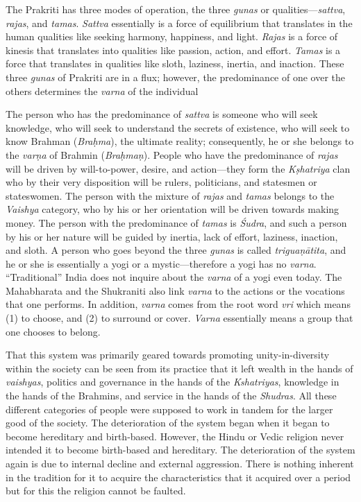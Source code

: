 The Prakriti  has three modes of operation, the three \textit{gunas} or qualities—\textit{sattva},  \textit{rajas},   and \textit{tamas}. \textit{Sattva} essentially is a force of equilibrium that translates in the human qualities like seeking harmony, happiness, and light. \textit{Rajas} is a force of kinesis that translates into qualities like passion, action, and effort. \textit{Tamas} is a force that translates in qualities like sloth, laziness, inertia, and inaction. These three \textit{gunas} of Prakriti  are in a flux; however, the predominance of one over the others determines the \textit{varna} of the individual

The person who has the predominance of \textit{sattva} is someone who will seek knowledge, who will seek to understand the secrets of existence, who will seek to know Brahman (\textit{Braḥma}), the ultimate reality; consequently, he or she belongs to the \textit{varṇa} of Brahmin (\textit{Braḥmaṇ}). People who have the predominance of \textit{rajas} will be driven by will-to-power, desire, and action—they form the \textit{Kṣhatriya} clan who by their very disposition will be rulers, politicians, and statesmen or stateswomen. The person with the mixture of \textit{rajas} and \textit{tamas} belongs to the \textit{Vaishya} category, who by his or her orientation will be driven towards making money. The person with the predominance of \textit{tamas} is \textit{Śudra},  and such a person by his or her nature will be guided by inertia, lack of effort, laziness, inaction, and sloth. A person who goes beyond the three \textit{gunas} is called \textit{triguaṇātita},  and he or she is essentially a yogi or a mystic—therefore a yogi has no \textit{varna}. “Traditional” India does not inquire about the \textit{varna} of a yogi even today. The Mahabharata and the Shukraniti also link \textit{varna} to the actions or the vocations that one performs. In addition, \textit{varna} comes from the root word \textit{vri} which means (1) to choose, and (2) to surround or cover. \textit{Varna} essentially means a group that one chooses to belong.

That this system was primarily geared towards promoting unity-in-diversity within the society can be seen from its practice that it left wealth in the hands of \textit{vaishyas},  politics and governance in the hands of the \textit{Kshatriyas},  knowledge in the hands of the Brahmins, and service in the hands of the \textit{Shudras}. All these different categories of people were supposed to work in tandem for the larger good of the society. The deterioration of the system began when it began to become hereditary and birth-based. However, the Hindu or Vedic religion never intended it to become birth-based and hereditary. The deterioration of the system again is due to internal decline and external aggression. There is nothing inherent in the tradition for it to acquire the characteristics that it acquired over a period but for this the religion cannot be faulted.
\eject

